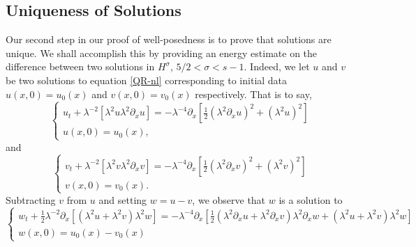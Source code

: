 \documentclass[reqno]{amsart}
\theoremstyle{plain}
\numberwithin{equation}{section}
\begin{document}
\subsection{Uniqueness of Solutions} Our second step in our proof of well-posedness is to prove that solutions are unique. We shall accomplish this by providing an energy estimate on the difference between two solutions in $H^\sigma$, $5/2<\sigma<s-1$. Indeed, we let $u$ and $v$ be two solutions to equation \eqref{QR-nl} corresponding to initial data $u(x,0)=u_0(x)$ and $v(x,0)=v_0(x)$ respectively. 
That is to say,
\begin{equation} 
 \begin{cases} u_t  + \lambda^{-2} \left[ \lambda ^2u \lambda^2 \partial_x u   \right] 
  = 
  - \lambda^{-4}  \partial_x \left[  \frac12 \left(\lambda ^2\partial_x  u  \right )^2  +   
\left( \lambda ^2  u  \right )^2  \right ]   
\\
u(x,0) = u_0(x) ,
\end{cases}
\end{equation}
and
\begin{equation} 
 \begin{cases} 
  v_t  + \lambda^{-2} \left[ \lambda^2 v \lambda^2\partial_x v  \right ] 
  = 
  - \lambda^{-4}  \partial_x \left[  \frac12 \left(\lambda^2 \partial_x  v  \right )^2  +   
\left( \lambda ^2  v  \right )^2 \right  ]   
\\
v(x,0) = v_0(x). 
\end{cases}
\end{equation}
Subtracting $v$ from $u$ and setting $w = u-v$, we observe that $w$ is a solution to 
\begin{equation} 
 \begin{cases} w_t  +  \frac12 \lambda^{-2}\partial_x  \left[ (\lambda^2 u +\lambda^2 v) \lambda ^2  w   \right] 
  = 
  - \lambda^{-4}  \partial_x \left[  \frac12  (\lambda^2\partial_x u +\lambda ^2\partial_xv) \lambda   ^2\partial_x w  +   
  (\lambda^2 u +\lambda^2 v) \lambda^2   w     \right ]   
\\
w(x,0) = u_0(x) -v_0(x)
\end{cases}  
 \end{equation}
\end{document}
